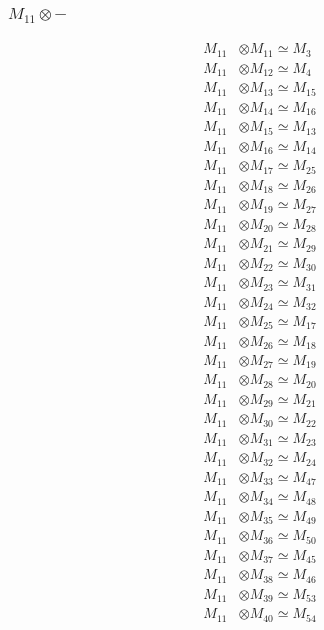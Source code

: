 \subsubsection{$ M_{11}\otimes -$}
\begin{align*}
M_{11} &\otimes M_{11} \simeq M_{3} \\
M_{11} &\otimes M_{12} \simeq M_{4} \\
M_{11} &\otimes M_{13} \simeq M_{15} \\
M_{11} &\otimes M_{14} \simeq M_{16} \\
M_{11} &\otimes M_{15} \simeq M_{13} \\
M_{11} &\otimes M_{16} \simeq M_{14} \\
M_{11} &\otimes M_{17} \simeq M_{25} \\
M_{11} &\otimes M_{18} \simeq M_{26} \\
M_{11} &\otimes M_{19} \simeq M_{27} \\
M_{11} &\otimes M_{20} \simeq M_{28} \\
M_{11} &\otimes M_{21} \simeq M_{29} \\
M_{11} &\otimes M_{22} \simeq M_{30} \\
M_{11} &\otimes M_{23} \simeq M_{31} \\
M_{11} &\otimes M_{24} \simeq M_{32} \\
M_{11} &\otimes M_{25} \simeq M_{17} \\
M_{11} &\otimes M_{26} \simeq M_{18} \\
M_{11} &\otimes M_{27} \simeq M_{19} \\
M_{11} &\otimes M_{28} \simeq M_{20} \\
M_{11} &\otimes M_{29} \simeq M_{21} \\
M_{11} &\otimes M_{30} \simeq M_{22} \\
M_{11} &\otimes M_{31} \simeq M_{23} \\
M_{11} &\otimes M_{32} \simeq M_{24} \\
M_{11} &\otimes M_{33} \simeq M_{47} \\
M_{11} &\otimes M_{34} \simeq M_{48} \\
M_{11} &\otimes M_{35} \simeq M_{49} \\
M_{11} &\otimes M_{36} \simeq M_{50} \\
M_{11} &\otimes M_{37} \simeq M_{45} \\
M_{11} &\otimes M_{38} \simeq M_{46} \\
M_{11} &\otimes M_{39} \simeq M_{53} \\
M_{11} &\otimes M_{40} \simeq M_{54} \\

\end{align*}
